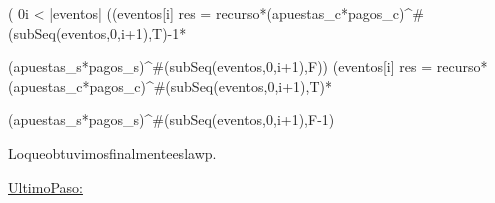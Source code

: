 \equiv ( 0\leq i < |eventos| \wedge ((eventos[i] \wedge res = recurso*(apuestas_c*pagos_c)^{\#(subSeq(eventos,0,i+1),T)-1}*
\vspace{0.2cm}

(apuestas_s*pagos_s)^{\#(subSeq(eventos,0,i+1),F)}) \vee (\neg eventos[i] \wedge  res = recurso*(apuestas_c*pagos_c)^{\#(subSeq(eventos,0,i+1),T)}*
\vspace{0.2cm}

(apuestas_s*pagos_s)^{\#(subSeq(eventos,0,i+1),F-1)}
\vspace{0.4cm}

Lo\hspace{3}que\hspace{3}obtuvimos\hspace{3}finalmente\hspace{3}es\hspace{3}la\hspace{3}wp.
\vspace{0.2cm}

\underline{UltimoPaso:}

